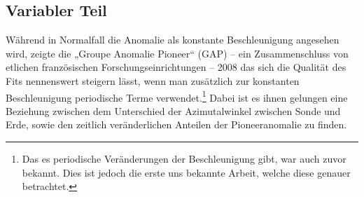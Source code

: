 
\subsection{Variabler Teil}
Während in Normalfall die Anomalie als konstante Beschleunigung angesehen wird, zeigte die „Groupe Anomalie Pioneer“ (GAP) –
ein Zusammenschluss von etlichen französischen Forschungseinrichtungen – 2008 das sich die Qualität des Fits nennenswert steigern lässt,
wenn man zusätzlich zur konstanten Beschleunigung periodische Terme verwendet.\footnote{Das es periodische Veränderungen der Beschleunigung gibt,
war auch zuvor bekannt. Dies ist jedoch die erste uns bekannte Arbeit, welche diese genauer betrachtet.} Dabei ist es ihnen gelungen eine
Beziehung zwischen dem Unterschied der Azimutalwinkel zwischen Sonde und Erde, sowie den zeitlich veränderlichen Anteilen der Pioneeranomalie zu finden. %
